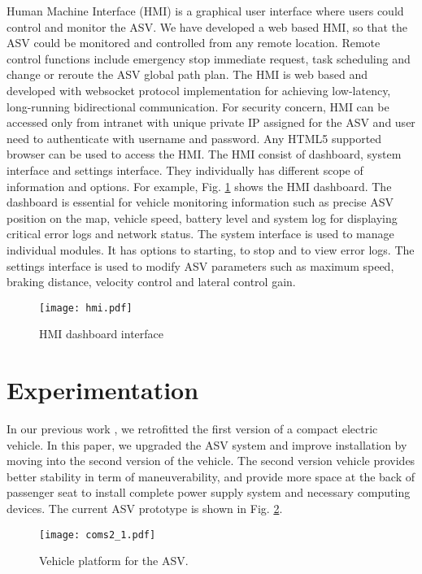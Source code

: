 \documentclass[10 pt,a4paper,conference]{IEEEtran}
\begin{document}
Human Machine Interface (HMI) is a graphical user interface where users
could control and monitor the ASV. We have developed a web based HMI, so
that the ASV could be monitored and controlled from any remote location.
Remote control functions include emergency stop immediate request, task
scheduling and change or reroute the ASV global path plan. The HMI is
web based and developed with websocket \citep{fette2011websocket}
protocol implementation for achieving low-latency, long-running
bidirectional communication. For security concern, HMI can be accessed
only from intranet with unique private IP assigned for the ASV and user
need to authenticate with username and password. Any HTML5 supported
browser can be used to access the HMI. The HMI consist of dashboard,
system interface and settings interface. They individually has different
scope of information and options. For example, Fig. \ref{fig_hmi} shows
the HMI dashboard. The dashboard is essential for vehicle monitoring
information such as precise ASV position on the map, vehicle speed,
battery level and system log for displaying critical error logs and
network status. The system interface is used to manage individual
modules. It has options to starting, to stop and to view error logs. The
settings interface is used to modify ASV parameters such as maximum
speed, braking distance, velocity control and lateral control gain.

\begin{figure}[!t]
\centering
\texttt{[image: hmi.pdf]}
\caption{HMI dashboard interface}
\label{fig_hmi}
\end{figure}

\section{Experimentation}\label{experimentation}

In our previous work \citep{SongZW_IV_2015}, we retrofitted the first
version of a compact electric vehicle. In this paper, we upgraded the
ASV system and improve installation by moving into the second version of
the vehicle. The second version vehicle provides better stability in
term of maneuverability, and provide more space at the back of passenger
seat to install complete power supply system and necessary computing
devices. The current ASV prototype is shown in Fig. \ref{coms1_bare}.

\begin{figure}[!t]
\centering
\texttt{[image: coms2\_1.pdf]}
\caption{Vehicle platform for the ASV.}
\label{coms1_bare}
\end{figure}
\end{document}
